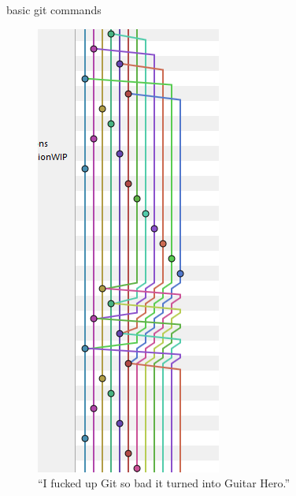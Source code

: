 \documentclass[10pt]{beamer}
\begin{document}
\begin{frame}{basic git commands}
\begin{itemize}
     \end{itemize}
      \framebreak
      \begin{figure}
       \begin{center}
       \includegraphics[keepaspectratio, width=\textwidth,height=0.9\textheight-4\baselineskip]{img/001_git_fuckup.png}
      \end{center}
      \caption{``I fucked up Git so bad it turned into Guitar Hero.''~\autocite{twitter}}
      \end{figure}
    \end{frame}
    
\end{document}
